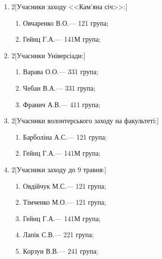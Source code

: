 \documentclass[
	a4paper,
	12pt,
	oneside,
	draft
]{extreport}
\begin{document}
\begin{enumerate}[topsep=0pt,itemsep=-1ex,partopsep=0ex,parsep=1ex]
\item 
\begin{multicols}{2}[Учасники заходу <<Кам'яна січ>>:] 
\begin{enumerate}[topsep=0pt,itemsep=-1ex,partopsep=0ex,parsep=1ex,label=\arabic*.]
\item Овчаренко В.О.\hfill --- 121 група;
\item Гейнц Г.А.\hfill --- 141М група;
\end{enumerate}
\end{multicols}

\item 
\begin{multicols}{2}[Учасники Універсіади:] 
\begin{enumerate}[topsep=0pt,itemsep=-1ex,partopsep=0ex,parsep=1ex,label=\arabic*.]
\item Варава О.О.\hfill --- 331 група;
\item Чебан В.А.\hfill --- 331 група;
\item Франич А.В.\hfill --- 411 група;
\end{enumerate}
\end{multicols}

\item 
\begin{multicols}{2}[Учасники волонтерського заходу на факультеті:] 
\begin{enumerate}[topsep=0pt,itemsep=-1ex,partopsep=0ex,parsep=1ex,label=\arabic*.]
\item Барболіна А.С.\hfill --- 121 група;
\item Гейнц Г.А.\hfill --- 141М група;
\end{enumerate}
\end{multicols}

\item 
\begin{multicols}{2}[Учасники заходу до 9 травня:] 
\begin{enumerate}[topsep=0pt,itemsep=-1ex,partopsep=0ex,parsep=1ex,label=\arabic*.]
\item Овдійчук М.С.\hfill --- 121 група;
\item Тімченко М.О.\hfill --- 121 група;
\item Гейнц Г.А.\hfill --- 141М група;
\item Лапік С.В.\hfill --- 221 група;
\item Корзун В.В.\hfill --- 241 група;
\end{enumerate}
\end{multicols}


\end{enumerate}
\end{document}
